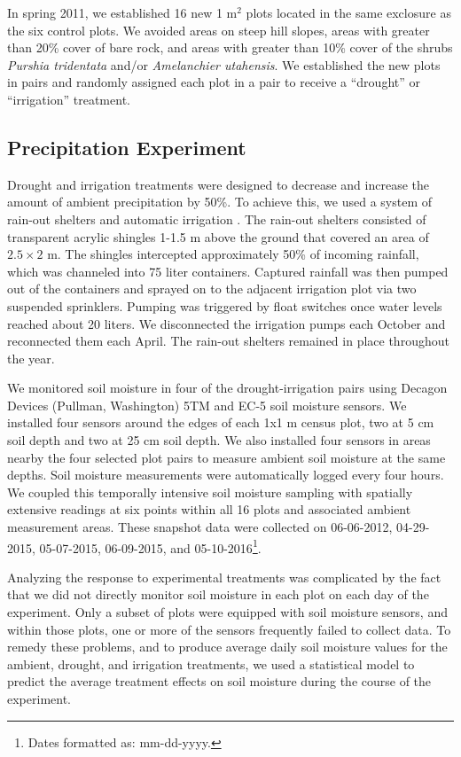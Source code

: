 \documentclass[fleqn,10pt,lineno]{wlpeerj} %
\begin{document}
In spring 2011, we established 16 new 1 m\(^2\) plots located in the
same exclosure as the six control plots. We avoided areas on steep hill
slopes, areas with greater than 20\% cover of bare rock, and areas with
greater than 10\% cover of the shrubs \emph{Purshia tridentata} and/or
\emph{Amelanchier utahensis}. We established the new plots in pairs and
randomly assigned each plot in a pair to receive a ``drought'' or
``irrigation'' treatment.

\subsection{Precipitation Experiment}\label{precipitation-experiment}

Drought and irrigation treatments were designed to decrease and increase
the amount of ambient precipitation by 50\%. To achieve this, we used a
system of rain-out shelters and automatic irrigation
\citep{Gherardi2013}. The rain-out shelters consisted of transparent
acrylic shingles 1-1.5 m above the ground that covered an area of
\(2.5\times2\) m. The shingles intercepted approximately 50\% of
incoming rainfall, which was channeled into 75 liter containers.
Captured rainfall was then pumped out of the containers and sprayed on
to the adjacent irrigation plot via two suspended sprinklers. Pumping
was triggered by float switches once water levels reached about 20
liters. We disconnected the irrigation pumps each October and
reconnected them each April. The rain-out shelters remained in place
throughout the year.

We monitored soil moisture in four of the drought-irrigation pairs using
Decagon Devices (Pullman, Washington) 5TM and EC-5 soil moisture
sensors. We installed four sensors around the edges of each 1x1 m census
plot, two at 5 cm soil depth and two at 25 cm soil depth. We also
installed four sensors in areas nearby the four selected plot pairs to
measure ambient soil moisture at the same depths. Soil moisture
measurements were automatically logged every four hours. We coupled this
temporally intensive soil moisture sampling with spatially extensive
readings  at six points within
all 16 plots and associated ambient measurement areas. These snapshot
data were collected on 06-06-2012, 04-29-2015, 05-07-2015, 06-09-2015,
and 05-10-2016\footnote{Dates formatted as: mm-dd-yyyy.}.

Analyzing the response to experimental treatments was complicated by the
fact that we did not directly monitor soil moisture in each plot on each
day of the experiment. Only a subset of plots were equipped with soil
moisture sensors, and within those plots, one or more of the sensors
frequently failed to collect data. To remedy these problems, and to
produce average daily soil moisture values for the ambient, drought, and
irrigation treatments, we used a statistical model to predict the
average treatment effects on soil moisture during the course of the
experiment.
\end{document}
